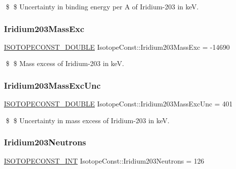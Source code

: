 \$ \$ Uncertainty in binding energy per A of Iridium-\/203 in keV. \mbox{\label{group___isotope_const-_iridium-_ir203_gac1d015feb7325c1d7585ae3067e2db6f}} 
\subsubsection{\texorpdfstring{Iridium203\+Mass\+Exc}{Iridium203MassExc}}
{\footnotesize\ttfamily \mbox{\hyperlink{group___isotope_const-_macros_ga8f45a7272ce02c0b4c65c44636ed719a}{I\+S\+O\+T\+O\+P\+E\+C\+O\+N\+S\+T\+\_\+\+D\+O\+U\+B\+LE}} Isotope\+Const\+::\+Iridium203\+Mass\+Exc = -\/14690}

\$ \$ Mass excess of Iridium-\/203 in keV. \mbox{\label{group___isotope_const-_iridium-_ir203_gaf4f49d367fb7ea237290565e063a7248}} 
\subsubsection{\texorpdfstring{Iridium203\+Mass\+Exc\+Unc}{Iridium203MassExcUnc}}
{\footnotesize\ttfamily \mbox{\hyperlink{group___isotope_const-_macros_ga8f45a7272ce02c0b4c65c44636ed719a}{I\+S\+O\+T\+O\+P\+E\+C\+O\+N\+S\+T\+\_\+\+D\+O\+U\+B\+LE}} Isotope\+Const\+::\+Iridium203\+Mass\+Exc\+Unc = 401}

\$ \$ Uncertainty in mass excess of Iridium-\/203 in keV. \mbox{\label{group___isotope_const-_iridium-_ir203_ga4744d47501506750495225474ef55b28}} 
\subsubsection{\texorpdfstring{Iridium203\+Neutrons}{Iridium203Neutrons}}
{\footnotesize\ttfamily \mbox{\hyperlink{group___isotope_const-_macros_ga5f18360b3e99483a35c32d789e62621c}{I\+S\+O\+T\+O\+P\+E\+C\+O\+N\+S\+T\+\_\+\+I\+NT}} Isotope\+Const\+::\+Iridium203\+Neutrons = 126}

